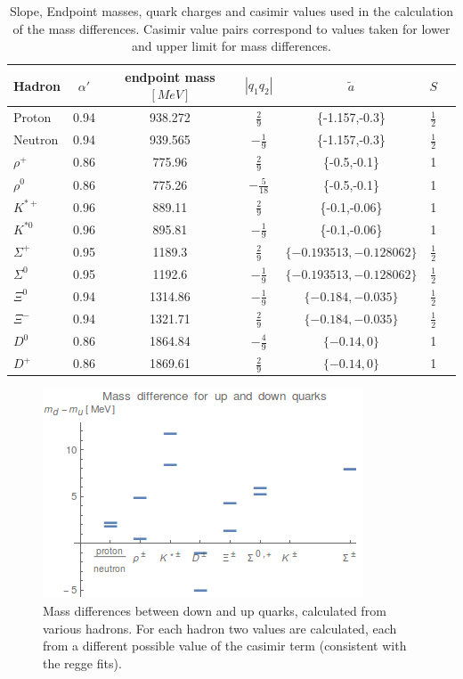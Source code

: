 \documentclass[11pt,a4paper]{article}
\begin{document}
\begin{table}
\centering
\begin{tabular}{|l|c|c|c|c|c|c|}
\hline
 Hadron & $\alpha'$ & endpoint mass$\left[MeV\right]$ & $|q_1q_2|$ & $\tilde{a}$ & $S$ \\ 
 \hline
Proton & 0.94 & 938.272 & $\frac{2}{9}$ & \{-1.157,-0.3\} & $\frac{1}{2}$  \\
Neutron & 0.94 & 939.565 & $-\frac{1}{9}$ & \{-1.157,-0.3\} & $\frac{1}{2}$  \\
$\rho^{+}$ & 0.86 & 775.96 & $\frac{2}{9}$ & \{-0.5,-0.1\} & 1  \\
$\rho^{0}$ & 0.86 & 775.26 & $-\frac{5}{18}$ & \{-0.5,-0.1\} & 1  \\
$K^{*+}$ & 0.96 & 889.11 & $\frac{2}{9}$ & \{-0.1,-0.06\} & 1  \\
$K^{*0}$ & 0.96 & 895.81 & $-\frac{1}{9}$ & \{-0.1,-0.06\} & 1  \\
$\Sigma^+$ & 0.95 & 1189.3 & $\frac{2}{9}$ & $\{-0.193513,-0.128062\}$ & $\frac{1}{2}$  \\
$\Sigma^0$ & 0.95 & 1192.6 & $-\frac{1}{9}$ & $\{-0.193513,-0.128062\}$ & $\frac{1}{2}$  \\
$\Xi^0$ & 0.94 & 1314.86 & $-\frac{1}{9}$ & $\{-0.184,-0.035\}$ & $\frac{1}{2}$  \\
$\Xi^-$ & 0.94 & 1321.71 & $\frac{2}{9}$ & $\{-0.184,-0.035\}$ & $\frac{1}{2}$  \\
$D^0$ & 0.86 & 1864.84 & $-\frac{4}{9}$ & $\{-0.14,0\}$ & 1  \\
$D^+$ & 0.86 & 1869.61 & $\frac{2}{9}$ & $\{-0.14,0\}$ & 1  \\
\hline
\end{tabular}
\caption{Slope, Endpoint masses, quark charges and casimir values used in the calculation of the mass differences. Casimir value pairs correspond to values taken for lower and upper limit for mass differences.}
\label{tab:massdiffdata}
\end{table}

\begin{figure}[h]
\centering
\includegraphics[scale=1]{figures/MassDifferences.png}
\caption{Mass differences between down and up quarks, calculated from various hadrons. For each hadron two values are calculated, each from a different possible value of the casimir term (consistent with the regge fits).}
\label{fig:massdiff}
\end{figure}
\end{document}

